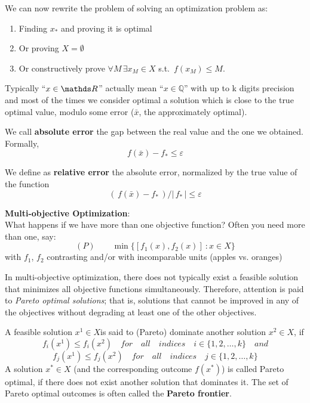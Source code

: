 \documentclass[computationalMathematics.tex]{subfiles}
\begin{document}
\noindent We can now rewrite the problem of solving an optimization problem as:
\begin{enumerate}
  \item Finding $x_*$ and proving it is optimal
  \item Or proving $X = \emptyset$
  \item Or constructively prove $\forall M \, \exists x_M \in X$ s.t.~$f(x_M) \leq M$.
\end{enumerate}

Typically “$x \in \R$” actually mean “$x \in \mathbb{Q}$” with up to k digits precision and most of the times we consider optimal a solution which is close to the true optimal value, modulo some error ($\bar{x}$, the approximately optimal).

\begin{definition}
  We call \textbf{absolute error} the gap between the real value and the one we obtained. Formally,
\[
  f(\bar{x}) - f_* \leq \varepsilon
\]
\end{definition}

\begin{definition}
  We define as \textbf{relative error} the absolute error, normalized by the true value of the function
\[
  ( \, f(\bar{x}) - f_* \, ) / | \, f_* \, | \leq \varepsilon
\]
\end{definition}

\noindent \textbf{Multi-objective Optimization}:\\
What happens if we have more than one objective function?\newline
Often you need more than one, say:
\[
  (P) \qquad \min \{[f_1(x),f_2(x)]~:x \in X\}
\]
with $f_1$, $f_2$ contrasting and/or with incomparable units (apples vs. oranges)

In multi-objective optimization, there does not typically exist a feasible solution that minimizes all objective functions simultaneously. Therefore, attention is paid to \emph{Pareto optimal solutions}; that is, solutions that cannot be improved in any of the objectives without degrading at least one of the other objectives.
\begin{definition}
   A feasible solution $x^{1} \in X$is said to (Pareto) dominate another solution $x^{2} \in X$, if
  \[
  f_{i}(x^{1})\leq f_{i}(x^{2})\quad for\quad all\quad indices\quad i \in \{ 1,2,\dots ,k\}\quad and
\]
\[
  f_{j}(x^{1})\leq f_{j}(x^{2})\quad for\quad all\quad indices\quad j \in \{ 1,2,\dots ,k\}
\]
A solution $x^{*}\in X$ (and the corresponding outcome $f(x^{*})$) is called Pareto optimal, if there does not exist another solution that dominates it. The set of Pareto optimal outcomes is often called the \textbf{Pareto frontier}.
\end{definition}
\end{document}
